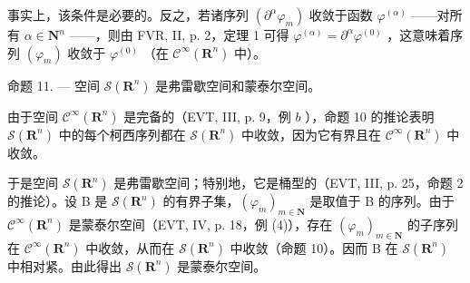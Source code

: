 事实上，该条件是必要的。反之，若诸序列 \((\partial^{\alpha}\varphi_{m})\) 收敛于函数 \(\varphi^{(\alpha)}\) ——对所有 \(\alpha\in \mathbf{N}^{n}\) ——，则由 FVR, II, p. 2，定理 1 可得 \(\varphi^{(\alpha)}=\partial^{\alpha}\varphi^{(0)}\) ，这意味着序列 \((\varphi_{m})\) 收敛于 \(\varphi^{(0)}\) （在 \(\mathcal{C}^{\infty}(\mathbf{R}^{n})\) 中）。

命题 11. --- 空间 \(\mathcal{S}(\mathbf{R}^{n})\) 是弗雷歇空间和蒙泰尔空间。

由于空间 \(\mathcal{C}^{\infty}(\mathbf{R}^{n})\) 是完备的（EVT, III, p. 9，例 \(b\) ），命题 10 的推论表明 \(\mathcal{S}(\mathbf{R}^{n})\) 中的每个柯西序列都在 \(\mathcal{S}(\mathbf{R}^{n})\) 中收敛，因为它有界且在 \(\mathcal{C}^{\infty}(\mathbf{R}^{n})\) 中收敛。

于是空间 \(\mathcal{S}(\mathbf{R}^n)\) 是弗雷歇空间；特别地，它是桶型的（EVT, III, p. 25，命题 2 的推论）。设 B 是 \(\mathcal{S}(\mathbf{R}^n)\) 的有界子集，\((\varphi_m)_{m \in \mathbf{N}}\) 是取值于 B 的序列。由于 \(\mathcal{C}^\infty(\mathbf{R}^n)\) 是蒙泰尔空间（EVT, IV, p. 18，例 (4)），存在 \((\varphi_m)_{m \in \mathbf{N}}\) 的子序列在 \(\mathcal{C}^\infty(\mathbf{R}^n)\) 中收敛，从而在 \(\mathcal{S}(\mathbf{R}^n)\) 中收敛（命题 10）。因而 B 在 \(\mathcal{S}(\mathbf{R}^n)\) 中相对紧。由此得出 \(\mathcal{S}(\mathbf{R}^n)\) 是蒙泰尔空间。

